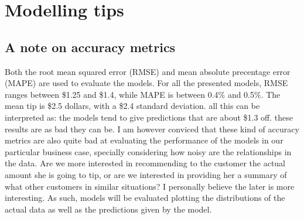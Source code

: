 \documentclass[11pt]{article}
\begin{document}
\section{Modelling tips}
\label{sec:orgfec0cf1}

\subsection{A note on accuracy metrics}
\label{sec:org5f5aba7}
Both the root mean squared error (RMSE) and mean absolute precentage
error (MAPE) are used to evaluate the models.
For all the presented models, RMSE ranges between \$1.25 and \$1.4, while
MAPE is between 0.4\% and 0.5\%.
The mean tip is \$2.5 dollars, with a \$2.4 standard deviation. all this can
be interpreted as: the models tend to give predictions that are about \$1.3 off.
these results are as bad they can be. I am however conviced that these kind of
accuracy metrics are also quite bad at evaluating the performance of
the models in our particular business case, specially considering how noisy
are the relationships in the data.
Are we more interested in recommending to the customer the actual amount
she is going to tip, or are we interested in providing her a summary of what
other customers in similar situations? I personally believe the later is more
interesting. As such, models will be evaluated plotting the distributions of the
actual data as well as the predictions given by the model.
\end{document}
